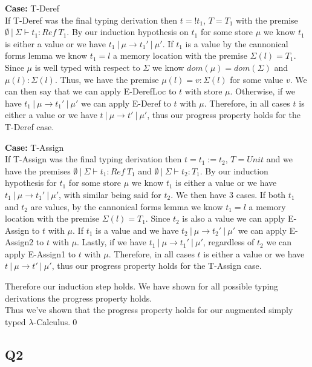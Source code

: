 \documentclass[12pt, fleqn]{article}
\begin{document}
\medskip
\textbf{Case:} T-Deref\\
If T-Deref was the final typing derivation then $t = !t_1$, $T = T_1$ with the premise $\emptyset\:|\:\Sigma \vdash t_1 : Ref\:T_1$. By our induction hypothesis on $t_1$ for some store $\mu$ we know $t_1$ is either a value or we have $t_1\:|\:\mu \rightarrow t_1'\:|\:\mu'$. 
If $t_1$ is a value by the cannonical forms lemma we know $t_1 = l$ a memory location with the premise $\Sigma(l) = T_1$. Since $\mu$ is well typed with respect to $\Sigma$ we know $dom(\mu) = dom(\Sigma)$ and $\mu(l) : \Sigma(l)$. Thus, we have the premise $\mu(l) = v : \Sigma(l)$ for some value $v$. We can then say that we can apply E-DerefLoc to $t$ with store $\mu$. Otherwise, if we have $t_1\:|\:\mu \rightarrow t_1'\:|\:\mu'$ we can apply E-Deref to $t$ with $\mu$. Therefore, in all cases $t$ is either a value or we have $t\:|\:\mu \rightarrow t'\:|\:\mu'$, thus our progress property holds for the T-Deref case.

\medskip
\textbf{Case:} T-Assign\\
If T-Assign was the final typing derivation then $t = t_1 := t_2$, $T = Unit$ and we have the premises $\emptyset\:|\:\Sigma \vdash t_1 : Ref \: T_1$ and $\emptyset\:|\:\Sigma \vdash t_2 : T_1$. By our induction hypothesis for $t_1$ for some store $\mu$ we know $t_1$ is either a value or we have $t_1\:|\:\mu \rightarrow t_1'\:|\:\mu'$, with similar being said for $t_2$. We then have 3 cases.
If both $t_1$ and $t_2$ are values, by the cannonical forms lemma we know $t_1 = l$ a memory location with the premise $\Sigma(l) = T_1$. Since $t_2$ is also a value we can apply E-Assign to $t$ with $\mu$.
If $t_1$ is a value and we have $t_2\:|\:\mu \rightarrow t_2'\:|\:\mu'$ we can apply E-Assign2 to $t$ with $\mu$. Lastly, if we have $t_1\:|\:\mu \rightarrow t_1'\:|\:\mu'$, regardless of $t_2$ we can apply E-Assign1 to $t$ with $\mu$. Therefore, in all cases $t$ is either a value or we have $t\:|\:\mu \rightarrow t'\:|\:\mu'$, thus our progress property holds for the T-Assign case.

\medskip
Therefore our induction step holds. We have shown for all possible typing derivations the progress property holds.\\
Thus we've shown that the progress property holds for our augmented simply typed $\lambda$-Calculus.\qed

\subsection{Q2}
\end{document}
